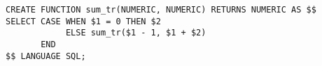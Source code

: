\begin{verbatim}
CREATE FUNCTION sum_tr(NUMERIC, NUMERIC) RETURNS NUMERIC AS $$
SELECT CASE WHEN $1 = 0 THEN $2
            ELSE sum_tr($1 - 1, $1 + $2)
       END
$$ LANGUAGE SQL;
\end{verbatim}